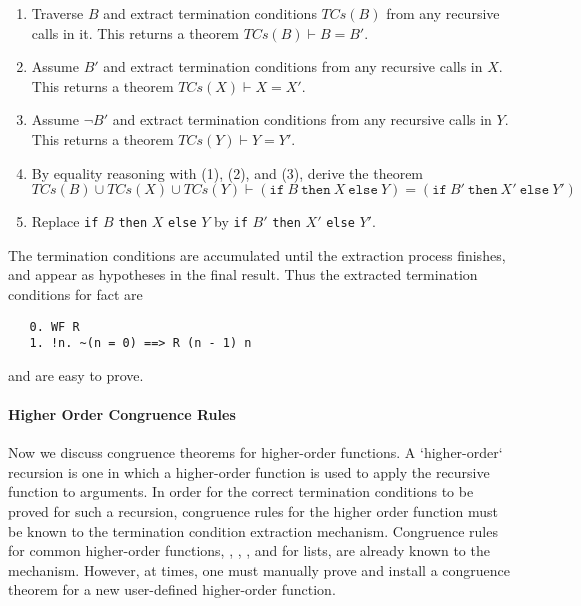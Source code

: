 \begin{enumerate}

\item Traverse $B$ and extract termination conditions 
     $\mathit{TCs}(B)$ from any recursive calls in it. 
     This returns a theorem $\mathit{TCs}(B) \vdash B = B'$.

\item Assume $B'$ and extract termination conditions from any
  recursive calls in $X$. This returns a theorem
  $\mathit{TCs}(X) \vdash X = X'$. 
 
\item Assume $\neg B'$ and extract termination conditions from any
   recursive calls in $Y$. This returns a theorem
   $\mathit{TCs}(Y) \vdash Y = Y'$. 
 
\item  By equality reasoning with (1), (2), and (3), derive the theorem
\[\mathit{TCs}(B) \cup \mathit{TCs}(X) \cup \mathit{TCs}(Y)
  \vdash
  (\mathtt{if}\ B\ \mathtt{then}\ X\ \mathtt{else}\ Y) = 
  (\mathtt{if}\ B'\ \mathtt{then}\ X'\ \mathtt{else}\ Y')
\] 
\item Replace \texttt{if} $B$ \texttt{then} $X$ \texttt{else} $Y$ by 
\texttt{if} $B'$ \texttt{then} $X'$ \texttt{else} $Y'$.

\end{enumerate}
 
 
The termination conditions are accumulated until the
extraction process finishes, and appear as hypotheses in the final
result. Thus the extracted termination conditions for {fact} are
%
\begin{hol}
\begin{verbatim}
   0. WF R
   1. !n. ~(n = 0) ==> R (n - 1) n
\end{verbatim}
\end{hol}
%
and are easy to prove. 
 
\paragraph{Higher Order Congruence Rules}

Now we discuss congruence theorems for higher-order functions. A
`higher-order` recursion is one in which a higher-order function is
used to apply the recursive function to arguments. In order for the
correct termination conditions to be proved for such a recursion,
congruence rules for the higher order function must be known to the
termination condition extraction mechanism. Congruence rules for
common higher-order functions, \eg, , , and
 for lists, are already known to the
mechanism. However, at times, one must manually prove and install a
congruence theorem for a new user-defined higher-order function.
 
